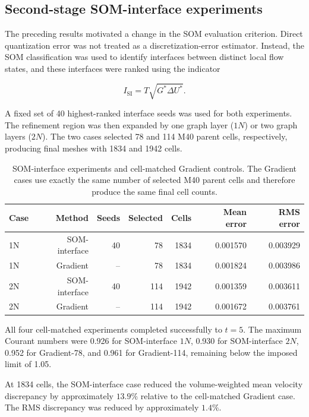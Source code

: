 \subsection{Second-stage SOM-interface experiments}

The preceding results motivated a change in the SOM evaluation criterion.
Direct quantization error was not treated as a discretization-error
estimator. Instead, the SOM classification was used to identify interfaces
between distinct local flow states, and these interfaces were ranked using
the indicator

\begin{equation}
I_{\mathrm{SI}}
=
T\sqrt{G^*\Delta U^*}.
\end{equation}

A fixed set of 40 highest-ranked interface seeds was used for both
experiments. The refinement region was then expanded by one graph layer
(\(1N\)) or two graph layers (\(2N\)). The two cases selected 78 and 114
M40 parent cells, respectively, producing final meshes with 1834 and 1942
cells.

\begin{table}[htbp]
\centering
\caption{SOM-interface experiments and cell-matched Gradient controls. The
Gradient cases use exactly the same number of selected M40 parent cells and
therefore produce the same final cell counts.}
\label{tab:som_interface_matched}
\small
\begin{tabular}{lrrrrrr}
\toprule
Case & Method & Seeds & Selected & Cells & Mean error & RMS error \\
\midrule
1N & SOM-interface & 40 & 78  & 1834 & 0.001570 & 0.003929 \\
1N & Gradient      & -- & 78  & 1834 & 0.001824 & 0.003986 \\
2N & SOM-interface & 40 & 114 & 1942 & 0.001359 & 0.003611 \\
2N & Gradient      & -- & 114 & 1942 & 0.001672 & 0.003761 \\
\bottomrule
\end{tabular}
\end{table}

All four cell-matched experiments completed successfully to \(t=5\).
The maximum Courant numbers were 0.926 for SOM-interface \(1N\), 0.930 for
SOM-interface \(2N\), 0.952 for Gradient-78, and 0.961 for Gradient-114,
remaining below the imposed limit of 1.05.

At 1834 cells, the SOM-interface case reduced the volume-weighted mean
velocity discrepancy by approximately \(13.9\%\) relative to the
cell-matched Gradient case. The RMS discrepancy was reduced by approximately
\(1.4\%\).

